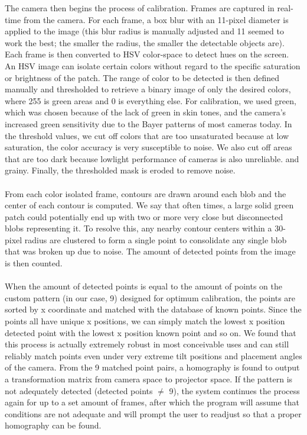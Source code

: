 \documentclass[twoside,twocolumn]{article}
\begin{document}
The camera then begins the process of calibration. Frames are captured in real-time from the camera. For each frame, a box blur with an 11-pixel diameter is applied to the image (this blur radius is manually adjusted and 11 seemed to work the best; the smaller the radius, the smaller the detectable objects are). Each frame is then converted to HSV color-space to detect hues on the screen. An HSV image can isolate certain colors without regard to the specific saturation or brightness of the patch. The range of color to be detected is then defined manually and thresholded to retrieve a binary image of only the desired colors, where 255 is green areas and 0 is everything else. For calibration, we used green, which was chosen because of the lack of green in skin tones, and the camera's increased green sensitivity due to the Bayer patterns of most cameras today. In the threshold values, we cut off colors that are too unsaturated because at low saturation, the color accuracy is very susceptible to noise. We also cut off areas that are too dark because lowlight performance of cameras is also unreliable. and grainy. Finally, the thresholded mask is eroded to remove noise.\\ \\
From each color isolated frame, contours are drawn around each blob and the center of each contour is computed. We say that often times, a large solid green patch could potentially end up with two or more very close but disconnected blobs representing it. To resolve this, any nearby contour centers within a 30-pixel radius are clustered to form a single point to consolidate any single blob that was broken up due to noise. The amount of detected points from the image is then counted. \\ \\
When the amount of detected points is equal to the amount of points on the custom pattern (in our case, 9) designed for optimum calibration, the points are sorted by x coordinate and matched with the database of known points. Since the points all have unique x positions, we can simply match the lowest x position detected point with the lowest x position known point and so on. We found that this process is actually extremely robust in most conceivable uses and can still reliably match points even under very extreme tilt positions and placement angles of the camera. From the 9 matched point pairs, a homography is found to output a transformation matrix from camera space to projector space. If the pattern is not adequately detected (detected points $\neq$ 9), the system continues the process again for up to a set amount of frames, after which the program will assume that conditions are not adequate and will prompt the user to readjust so that a proper homography can be found.\\ \\
\end{document}

